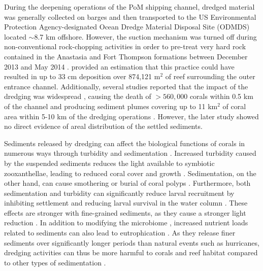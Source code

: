 \documentclass[preprint,12pt,authoryear]{elsarticle}
\begin{document}
During the deepening operations of the PoM shipping channel, dredged material was generally collected on barges and then transported to the US Environmental Protection Agency-designated Ocean Dredge Material Disposal Site (ODMDS) located $\sim$8.7 km offshore. However, the suction mechanism was turned off during non-conventional rock-chopping activities in order to pre-treat very hard rock contained in the Anastasia and Fort Thompson formations between December 2013 and May 2014 \citep{miller2016detecting}. \cite{usace2017} provided an estimation that this practice could have resulted in up to 33 cm deposition over 874,121 m$^2$ of reef surrounding the outer entrance channel. Additionally, several studies reported that the impact of the dredging was widespread \citep{miller2016detecting}, causing the death of  $> 560,000$ corals within 0.5 km of the channel \citep{cunning2019extensive} and producing sediment plumes covering up to 11 km$^2$ of coral area within 5-10 km of the dredging operations \citep{barnes2015sediment}. However, the later study showed no direct evidence of areal distribution of the settled sediments. 

Sediments released by dredging can affect the biological functions of corals in numerous ways  through turbidity and sedimentation \citep{erftemeijer2012environmental,jones2015effects}. Increased turbidity caused by the suspended sediments reduces the light available to symbiotic zooxanthellae, leading to reduced coral cover and growth \citep{kendall1983effects,rogers1990responses,anthony1999tank,hennige2008photoacclimation}. Sedimentation, on the other hand, can cause smothering or burial of coral polyps \citep{erftemeijer2012environmental,jones2015effects,jones2019sediment}. Furthermore, both sedimentation and turbidity can significantly reduce larval recruitment by inhibiting settlement and reducing larval survival in the water column \citep{jones2015effects}. These effects are stronger with fine-grained sediments, as they cause a stronger light reduction \citep{storlazzi2015influence,fourney2017additive}. In addition to modifying the microbiome \citep{rosales2019oceanographic}, increased nutrient loads related to sediments can also lead to eutrophication \citep{wittenberg1992effects}.
As they release finer sediments over significantly longer periods than natural events such as hurricanes, dredging activities can thus be more harmful to corals and reef habitat compared to other types of sedimentation \citep{cunning2019extensive}.
\end{document}

